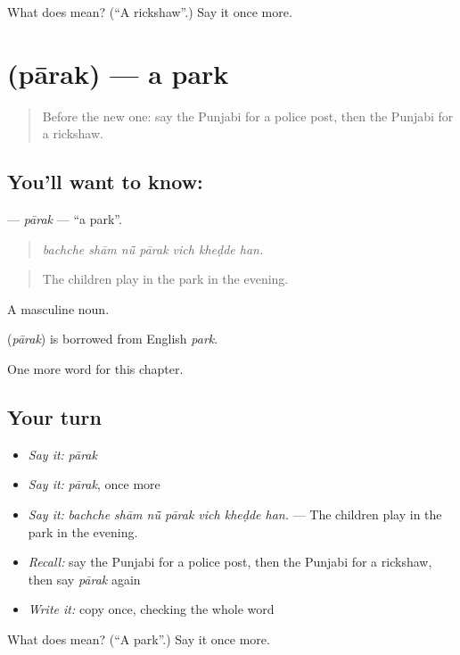 \begin{tcolorbox}[breakable,colback=teal!4,colframe=teal!35!black,title={Before you move on}]
What does  mean? (\textquotedblleft{}A rickshaw\textquotedblright{}.) Say it once more.
\end{tcolorbox}
\section[\texorpdfstring{\pa{ਪਾਰਕ} (pārak)}{ਪਾਰਕ (pārak)}]{ (pārak) — a park}

\label{lesson:PA-C272-parak}



\begin{quote}
Before the new one: say the Punjabi for a police post, then the Punjabi for a rickshaw.
\end{quote}

\subsection*{You'll want to know: }
\textbf{} — \emph{pārak} — \textquotedblleft{}a park\textquotedblright{}.

\begin{quote}
      
\end{quote}

\begin{quote}
\emph{bachche shām nū̃ pārak vich kheḍde han.}
\end{quote}

\begin{quote}
The children play in the park in the evening.
\end{quote}

A masculine noun.

\begin{cousinweb}
\textbf{} (\emph{pārak}) is borrowed from English \emph{park}.
\end{cousinweb}

\begin{grammarlens}[title={What you've built}]
One more word for this chapter.
\end{grammarlens}

\subsection*{Your turn}
\begin{itemize}
\raggedright
  \item \emph{Say it:} \emph{pārak}
  \item \emph{Say it:} \emph{pārak}, once more
  \item \emph{Say it:} \emph{bachche shām nū̃ pārak vich kheḍde han.} — The children play in the park in the evening.
  \item \emph{Recall:} say the Punjabi for a police post, then the Punjabi for a rickshaw, then say \emph{pārak} again
  \item \emph{Write it:} copy \textbf{} once, checking the whole word
\end{itemize}

\begin{tcolorbox}[breakable,colback=teal!4,colframe=teal!35!black,title={Before you move on}]
What does  mean? (\textquotedblleft{}A park\textquotedblright{}.) Say it once more.
\end{tcolorbox}
